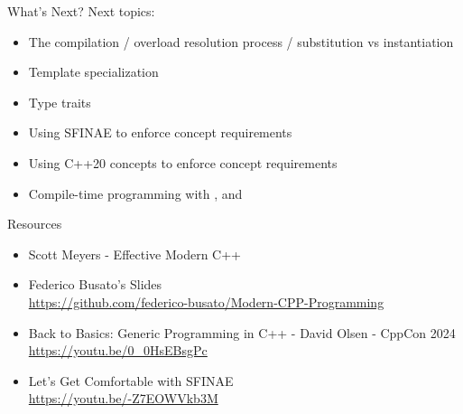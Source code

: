\begin{frame}[fragile]{What's Next?}
  Next topics:
  \begin{itemize}
    \item The compilation / overload resolution process / substitution vs instantiation
    \item Template specialization
    \item Type traits
    \item Using SFINAE to enforce concept requirements
    \item Using C++20 concepts to enforce concept requirements
    \item Compile-time programming with , and 
  \end{itemize}
\end{frame}

\begin{frame}[fragile]{Resources}
  \begin{itemize}
    \item Scott Meyers - Effective Modern C++
    \item Federico Busato's Slides\\
    \url{https://github.com/federico-busato/Modern-CPP-Programming}
    \item Back to Basics: Generic Programming in C++ - David Olsen - CppCon 2024 \\
    \url{https://youtu.be/0_0HsEBsgPc}
    \item Let's Get Comfortable with SFINAE\\
    \url{https://youtu.be/-Z7EOWVkb3M}
  \end{itemize}
\end{frame}
